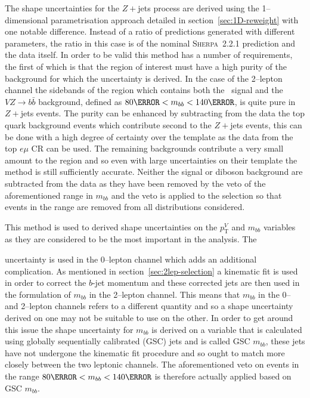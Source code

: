 The shape uncertainties for the $Z+$jets process are derived using the
1--dimensional parametrisation approach detailed in
section~\ref{sec:1D-reweight} with one notable difference. Instead of a ratio of
predictions generated with different parameters, the ratio in this case is of
the nominal \textsc{Sherpa}~2.2.1 prediction and the data itself. In order to be
valid this method has a number of requirements, the first of which is that the
region of interest must have a high purity of the background for which the
uncertainty is derived. In the case of the 2--lepton channel the sidebands of
the region which contains both the \VHbb\ signal and the $V\!Z\!\to\! b\bar{b}$
background, defined as  $80 \GeV < m_{bb} < 140 \GeV$, is quite pure in $Z+$jets
events. The purity can be enhanced by subtracting from the data the top quark
background events which contribute second to the $Z+$jets events, this can be
done with a high degree of certainty over the template as the data from the top
$e\mu$ CR can be used. The remaining backgrounds contribute a very small amount
to the region and so even with large uncertainties on their template the method
is still sufficiently accurate. Neither the signal or diboson background are
subtracted from the data as they have been removed by the veto of the
aforementioned range in $m_{bb}$ and the veto is applied to the selection so
that events in the range are removed from all distributions considered.

This method is used to derived shape uncertainties on the $p_{\mathrm{T}}^V$ and
$m_{bb}$ variables as they are considered to be the most important in the
analysis. The

uncertainty is used in the 0--lepton channel which adds an additional
complication. As mentioned in section~\ref{sec:2lep-selection} a kinematic fit
is used in order to correct the $b$-jet momentum and these corrected jets are then
used in the formulation of $m_{bb}$ in the 2--lepton channel. This means that
$m_{bb}$ in the 0-- and 2--lepton channels refers to a different quantity and so
a shape uncertainty derived on one may not be suitable to use on the other. In
order to get around this issue the shape uncertainty for $m_{bb}$ is derived on
a variable that is calculated using globally sequentially calibrated (GSC) jets
and is called GSC $m_{bb}$, these jets have not undergone the kinematic fit
procedure and so ought to match more closely between the two leptonic channels.
The aforementioned veto on events in the range $80 \GeV < m_{bb} < 140 \GeV$ is
therefore actually applied based on GSC $m_{bb}$.

